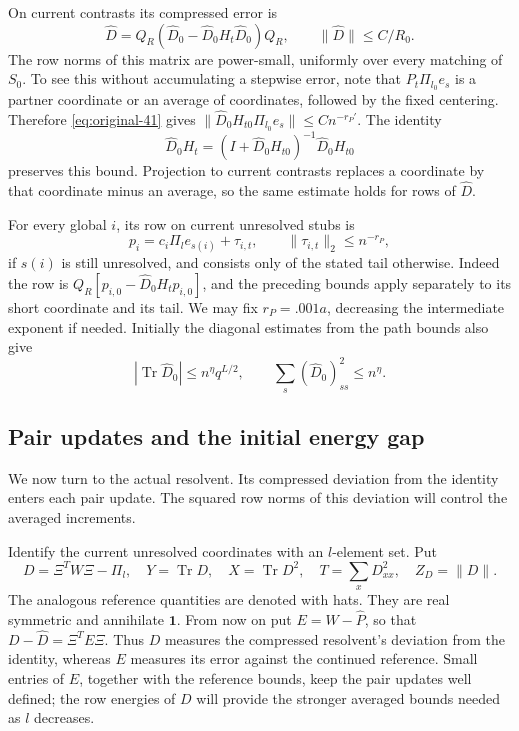 On current contrasts its compressed error is
\[
 \widehat D
 =Q_R(\widehat D_0-\widehat D_0H_t\widehat D_0)Q_R,
 \qquad \|\widehat D\|\le C/R_0.
\]
The row norms of this matrix are power-small, uniformly over every
matching of $S_0$.  To see this without accumulating a stepwise
error, note that $P_t\Pi_{l_0}e_s$ is a partner coordinate or an
average of coordinates, followed by the fixed centering.  Therefore
\eqref{eq:original-41} gives
$\|\widehat D_0H_{t0}\Pi_{l_0}e_s\|\le Cn^{-r_P'}$.
The identity
\[
 \widehat D_0H_t
 =(I+\widehat D_0H_{t0})^{-1}\widehat D_0H_{t0}
\]
preserves this bound.  Projection to current contrasts replaces a
coordinate by that coordinate minus an average, so the same estimate
holds for rows of $\widehat D$.

For every global $i$, its row on current unresolved stubs is
\begin{equation}
 p_i=c_i\Pi_le_{s(i)}+\tau_{i,t},\qquad
 \|\tau_{i,t}\|_2\le n^{-r_P},
 \label{eq:original-43}
\end{equation}
if $s(i)$ is still unresolved, and consists only of the stated tail
otherwise.  Indeed the row is
$Q_R[p_{i,0}-\widehat D_0H_tp_{i,0}]$, and the preceding bounds
apply separately to its short coordinate and its tail.
We may fix $r_P=.001a$, decreasing the intermediate exponent if
needed.  Initially the diagonal estimates from the path bounds also
give
\[
 |\operatorname{Tr}\widehat D_0|\le n^\eta q^{L/2},\qquad
 \sum_s(\widehat D_0)_{ss}^2\le n^\eta.
\]

\subsection{Pair updates and the initial energy gap}

We now turn to the actual resolvent.  Its compressed deviation from the
identity enters each pair update.  The squared row norms of this deviation
will control the averaged increments.

Identify the current unresolved coordinates with an $l$-element set.
Put
\[
 D=\Xi^TW\Xi-\Pi_l,\quad
 Y=\operatorname{Tr}D,\quad X=\operatorname{Tr}D^2,\quad
 T=\sum_xD_{xx}^2,\quad Z_D=\|D\|.
\]
The analogous reference quantities are denoted with hats.  They are
real symmetric and annihilate $\mathbf1$.  From now on put
$E=W-\widehat P$, so that $D-\widehat D=\Xi^TE\Xi$.
Thus $D$ measures the compressed resolvent's deviation from the identity,
whereas $E$ measures its error against the continued reference.  Small
entries of $E$, together with the reference bounds, keep the pair updates
well defined; the row energies of $D$ will provide the stronger averaged
bounds needed as $l$ decreases.

